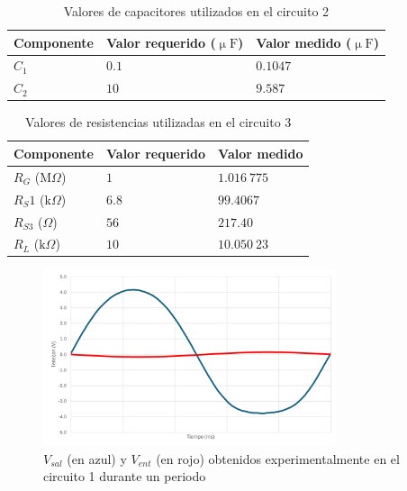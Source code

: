 \documentclass[journal]{IEEEtran}
\begin{document}
\begin{table}[H]
        \renewcommand{\arraystretch}{1.5}
        \caption{Valores de capacitores utilizados en el circuito 2}
        \centering
        \begin{tabular}{ >{\centering\arraybackslash}m{2.5cm} >{\centering\arraybackslash}m{2.65cm} >{\centering\arraybackslash}m{2.5cm} }
                \hline
            Componente & Valor requerido ($\upmu\mathrm{F}$) & Valor medido ($\upmu\mathrm{F}$) \\ 
            \hline
            $C_1$ & $0.1$ & $0.1047$  \\ 
            $C_2$ & $10$  & $9.587$  \\
            \hline
        \end{tabular}
        \label{tabla4}
    \end{table}

\begin{table}[H]
        \renewcommand{\arraystretch}{1.5}
        \caption{Valores de resistencias utilizadas en el circuito 3}
        \centering
        \begin{tabular}{ >{\centering\arraybackslash}m{2.5cm} >{\centering\arraybackslash}m{2.5cm} >{\centering\arraybackslash}m{2.5cm} }
                \hline
            Componente & Valor requerido & Valor medido\\ 
            \hline
            $R_G$ ($\mathrm{M}\Omega$) & $1$  & $1.016~775$  \\ 
            $R_S1$ ($\mathrm{k}\Omega$) & $6.8$  & $99.4067$  \\
            $R_{S3}$ ($\Omega$) & $56$  & $217.40$  \\
            $R_L$ ($\mathrm{k}\Omega$) & $10$  & $10.050~23$  \\
            \hline
        \end{tabular}
        \label{tabla5}
    \end{table}


\begin{figure}[H]
        \centering
        \includegraphics[width=3.4in]{C1111.png}
        \caption{$V_{sal}$ (en azul) y $V_{ent}$ (en rojo) obtenidos experimentalmente en el circuito 1 durante un periodo}
        \label{fig:SignalExperimental_02}
\end{figure}
\end{document}

